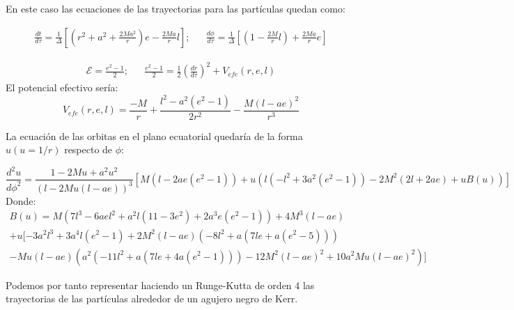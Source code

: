 \documentclass{article}
\begin{document}
En este caso las ecuaciones de las trayectorias para las partículas quedan como:

\begin{align}
    \frac{dt}{d\tau}=\frac{1}{\Delta}\left[\left(r^{2}+a^{2}+\frac{2Ma^{2}}{r}\right)e-\frac{2Ma}{r}l\right]; && \frac{d\phi}{d\tau}=\frac{1}{\Delta}\left[\left(1-\frac{2M}{r}l\right)+\frac{2Ma}{r}e\right]
\end{align}

\begin{align}
    \mathcal{E}=\frac{e^{2}-1}{2}; && \frac{e^{2}-1}{2}=\frac{1}{2}\left(\frac{dr}{d\tau}\right)^{2}+V_{efe}(r,e,l)
\end{align}
El potencial efectivo sería:
\begin{equation}\label{39}
    V_{efe}(r,e,l)=\frac{-M}{r}+\frac{l^{2}-a^{2}(e^{2}-1)}{2r^{2}}-\frac{M(l-ae)^{2}}{r^{3}}
\end{equation}

La ecuación de las orbitas en el plano ecuatorial  quedaría de la forma $u(u=1/r)$ respecto de $\phi$: \cite{bambhaniya2021precession}

\begin{equation}\label{Kerr_Motion}
    \frac{d^{2}u}{d\phi^{2}}=\frac{1-2Mu+a^{2}u^{2}}{(l-2Mu(l-ae))^{3}}[M(l-2ae(e^{2}-1))+u(l(-l^{2}+3a^{2}(e^{2}-1))-2M^{2}(2l+2ae)+uB(u))]
\end{equation}
Donde:
\begin{multline*}
    B(u)=M(7l^{3}-6ael^{2}+a^{2}l(11-3e^{2})+2a^{3}e(e^{2}-1))+4M^{3}(l-ae)\\
    +u[-3a^{2}l^{3}+3a^{4}l(e^{2}-1)+2M^{2}(l-ae)(-8l^{2}+a(7le+a(e^{2}-5)))\\
    -Mu(l-ae)(a^{2}(-11l^{2}+a(7le+4a(e^{2}-1)))-12M^{2}(l-ae)^{2}+10a^{2}Mu(l-ae)^{2})]
\end{multline*}

Podemos por tanto representar haciendo un Runge-Kutta de orden 4 las trayectorias de las partículas alrededor de un agujero negro de Kerr.
\end{document}
